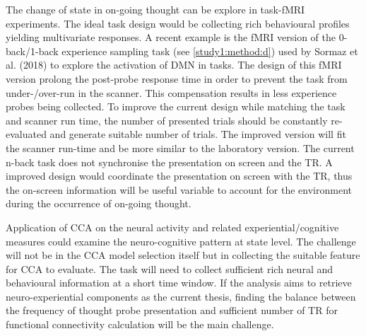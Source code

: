 The change of state in on-going thought can be explore in task-fMRI experiments. The ideal task design would be collecting rich behavioural profiles yielding multivariate responses. A recent example is the fMRI version of the 0-back/1-back experience sampling task (see \cref{study1:method:d}) used by Sormaz et al. (2018) to explore the activation of DMN in tasks. The design of this fMRI version prolong the post-probe response time in order to prevent the task from under-/over-run in the scanner. This compensation results in less experience probes being collected. To improve the current design while matching the task and scanner run time, the number of presented trials should be constantly re-evaluated and generate suitable number of trials. The improved version will fit the scanner run-time and be more similar to the laboratory version. The current n-back task does not synchronise the presentation on screen and the TR. A improved design would coordinate the presentation on screen with the TR, thus the on-screen information will be useful variable to account for the environment during the occurrence of on-going thought.

Application of CCA on the neural activity and related experiential/cognitive measures could examine the neuro-cognitive pattern at state level. The challenge will not be in the CCA model selection itself but in collecting the suitable feature for CCA to evaluate. The task will need to collect sufficient rich neural and behavioural information at a short time window. If the analysis aims to retrieve neuro-experiential components as the current thesis, finding the balance between the frequency of thought probe presentation and sufficient number of TR for functional connectivity calculation will be the main challenge.


